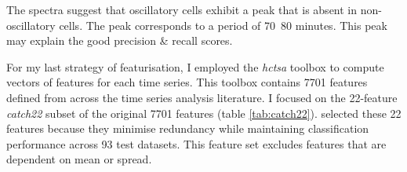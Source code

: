 The spectra suggest that oscillatory cells exhibit a peak that is absent in non-oscillatory cells.
The peak corresponds to a period of 70~80 minutes.
This peak may explain the good precision \& recall scores.

For my last strategy of featurisation,
I employed the \textit{hctsa} toolbox \parencite{fulcherHctsaComputationalFramework2017} to compute vectors of features for each time series.
This toolbox contains 7701 features defined from across the time series analysis literature.
I focused on the 22-feature \textit{catch22} subset of the original 7701 features (table \ref{tab:catch22}).
\textcite{lubbaCatch22CAnonicalTimeseries2019} selected these 22 features because they minimise redundancy while maintaining classification performance across 93 test datasets.
This feature set excludes features that are dependent on mean or spread.

